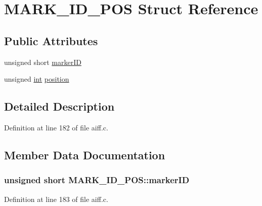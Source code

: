 \hypertarget{struct_m_a_r_k___i_d___p_o_s}{}\section{M\+A\+R\+K\+\_\+\+I\+D\+\_\+\+P\+OS Struct Reference}
\label{struct_m_a_r_k___i_d___p_o_s}
\subsection*{Public Attributes}
\begin{DoxyCompactItemize}
\item 
unsigned short \hyperlink{struct_m_a_r_k___i_d___p_o_s_a6ad5bc1c1cff224bb8a6ee014a3e98be}{marker\+ID}
\item 
unsigned \hyperlink{xmltok_8h_a5a0d4a5641ce434f1d23533f2b2e6653}{int} \hyperlink{struct_m_a_r_k___i_d___p_o_s_ab2bc7ea9aefff777f0fc3eff19d45f87}{position}
\end{DoxyCompactItemize}


\subsection{Detailed Description}


Definition at line 182 of file aiff.\+c.



\subsection{Member Data Documentation}
\subsubsection[{\texorpdfstring{marker\+ID}{markerID}}]{\setlength{\rightskip}{0pt plus 5cm}unsigned short M\+A\+R\+K\+\_\+\+I\+D\+\_\+\+P\+O\+S\+::marker\+ID}\hypertarget{struct_m_a_r_k___i_d___p_o_s_a6ad5bc1c1cff224bb8a6ee014a3e98be}{}\label{struct_m_a_r_k___i_d___p_o_s_a6ad5bc1c1cff224bb8a6ee014a3e98be}


Definition at line 183 of file aiff.\+c.


